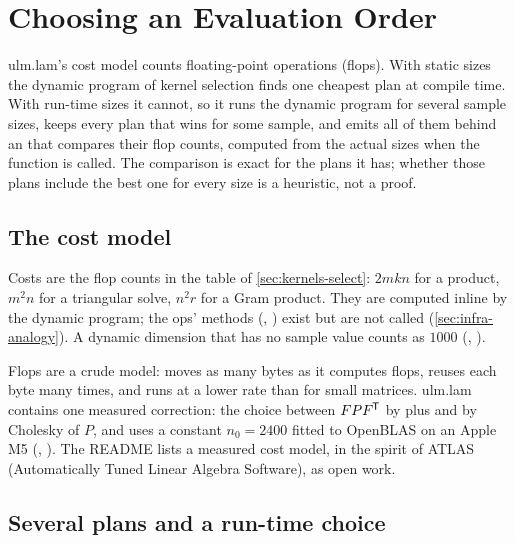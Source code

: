 \chapter{Choosing an Evaluation Order}
\label{ch:orders}

\begin{answer}
ulm.lam's cost model counts floating-point operations (flops). With static
sizes the dynamic program of kernel selection finds one cheapest plan at
compile time. With run-time sizes it cannot, so it runs the dynamic program
for several sample sizes, keeps every plan that wins for some sample, and
emits all of them behind an  that compares their flop counts,
computed from the actual sizes when the function is called. The comparison
is exact for the plans it has; whether those plans include the best one for
every size is a heuristic, not a proof.
\end{answer}

\section{The cost model}
\label{sec:orders-cost}

Costs are the flop counts in the table of \cref{sec:kernels-select}: \(2mkn\)
for a product, \(m^2n\) for a triangular solve, \(n^2 r\) for a Gram
product. They are computed inline by the dynamic program; the ops'
 methods (,
) exist but are not called
(\cref{sec:infra-analogy}). A dynamic dimension that has no sample value
counts as \(1000\) (, ).

Flops are a crude model:  moves as many bytes as it computes
flops,  reuses each byte many times, and  runs at a
lower rate than  for small matrices. ulm.lam contains one
measured correction: the choice between \(F P F^{\mkern-1.5mu\mathsf{T}}\) by  plus
 and by Cholesky of \(P\),  and  uses a
constant \(n_0 = 2400\) fitted to OpenBLAS on an Apple M5
(, ). The
README lists a measured cost model, in the spirit of ATLAS (Automatically Tuned Linear Algebra
Software), as open work.

\section{Several plans and a run-time choice}
\label{sec:orders-runtime}

